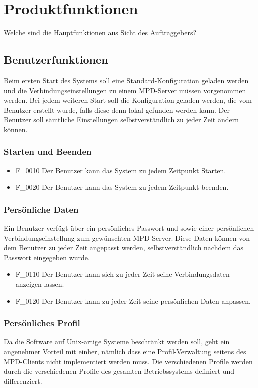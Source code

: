 \chapter{Produktfunktionen}
Welche sind die Hauptfunktionen aus Sicht des Auftraggebers?

\section{Benutzerfunktionen}
Beim ersten Start des Systems soll eine Standard-Konfiguration geladen werden und die Verbindungseinstellungen zu einem MPD-Server müssen vorgenommen werden. Bei jedem weiteren Start soll die Konfiguration geladen werden, die vom Benutzer erstellt wurde, falls diese denn lokal gefunden werden kann. Der Benutzer soll sämtliche Einstellungen selbstverständlich zu jeder Zeit ändern können.
\subsection{Starten und Beenden}
\renewcommand{\labelitemi}{•}
\begin{itemize}
	\item F\_0010 Der Benutzer kann das System zu jedem Zeitpunkt Starten.
	\item F\_0020 Der Benutzer kann das System zu jedem Zeitpunkt beenden.
\end{itemize}
\subsection{Persönliche Daten}
Ein Benutzer verfügt über ein persönliches Passwort und sowie einer persönlichen Verbindungseinstellung zum gewünschten MPD-Server. Diese Daten können von dem Benutzer zu jeder Zeit angepasst werden, selbstverständlich nachdem das Passwort eingegeben wurde.
\begin{itemize}
	\item F\_0110 Der Benutzer kann sich zu jeder Zeit seine Verbindungsdaten anzeigen lassen.
	\item F\_0120 Der Benutzer kann zu jeder Zeit seine persönlichen Daten anpassen.
\end{itemize}
\subsection{Persönliches Profil}
Da die Software auf Unix-artige Systeme beschränkt werden soll, geht ein angenehmer Vorteil mit einher, nämlich dass eine Profil-Verwaltung seitens des MPD-Clients nicht implementiert werden muss. Die verschiedenen Profile werden durch die verschiedenen Profile des gesamten Betriebssystems definiert und differenziert.
